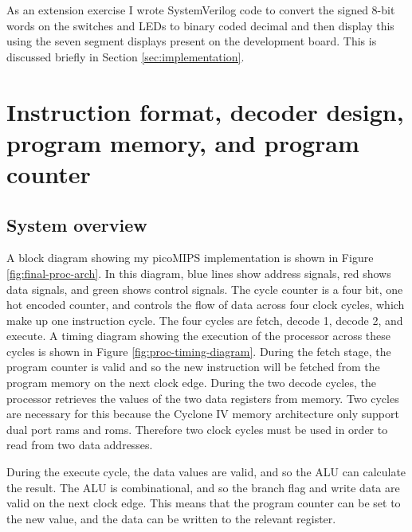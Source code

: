 As an extension exercise I wrote SystemVerilog code to convert the signed 8-bit words on the switches and LEDs to binary coded decimal and then display this using the seven segment displays present on the development board. This is discussed briefly in Section \ref{sec:implementation}.


\section{Instruction format, decoder design, program memory, and program counter} \label{sec:instructions}

\subsection{System overview}

A block diagram showing my picoMIPS implementation is shown in Figure \ref{fig:final-proc-arch}. In this diagram, blue lines show address signals, red shows data signals, and green shows control signals. The cycle counter is a four bit, one hot encoded counter, and controls the flow of data across four clock cycles, which make up one instruction cycle. The four cycles are fetch, decode 1, decode 2, and execute. A timing diagram showing the execution of the processor across these cycles is shown in Figure \ref{fig:proc-timing-diagram}. During the fetch stage, the program counter is valid and so the new instruction will be fetched from the program memory on the next clock edge. During the two decode cycles, the processor retrieves the values of the two data registers from memory. Two cycles are necessary for this because the Cyclone IV memory architecture only support dual port \glspl{ram} and \glspl{rom}. Therefore two clock cycles must be used in order to read from two data addresses.

During the execute cycle, the data values are valid, and so the ALU can calculate the result. The ALU is combinational, and so the branch flag and write data are valid on the next clock edge. This means that the program counter can be set to the new value, and the data can be written to the relevant register.

